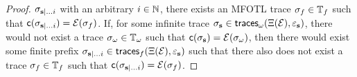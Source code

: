 \begin{proof}
    $\sigma_{\mathbf{s} |\dots i}$
    with an arbitrary $i \in \mathbb{N}$,
    there exists an MFOTL
    trace $\sigma_f \in \mathbb{T}_f$ such that
    $\mathsf{c}(\sigma_{\mathbf{s} |\dots i}) = \mathcal{E}(\sigma_f)$.
    If, for some infinite trace
    $\sigma_{\mathbf{s}} \in \mathsf{traces}_\omega(\Xi(\mathcal{E}), \varepsilon_{\mathbf{s}})$,
    there would not exist a trace $\sigma_\omega \in \mathbb{T}_\omega$
    such that $\mathsf{c}(\sigma_{\mathbf{s}}) = \mathcal{E}(\sigma_\omega)$,
    then there would exist some finite prefix
    $\sigma_{\mathbf{s} |\dots i} \in \mathsf{traces}_f(\Xi(\mathcal{E}), \varepsilon_{\mathbf{s}})$
    such that there also does not exist a trace
    $\sigma_f \in \mathbb{T}_f$ such that
    $\mathsf{c}(\sigma_{\mathbf{s} |\dots i}) = \mathcal{E}(\sigma_f)$.
\end{proof}

